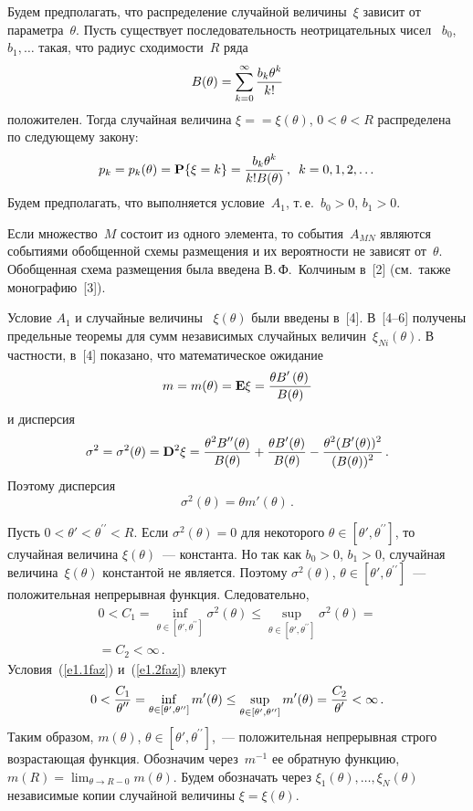 \begin{multicols}{2}
Будем предполагать, что распределение случайной величины~$\xi$
зависит от параметра~$\theta$. Пусть существует последовательность
неотрицательных чисел~ $b_0$, $b_1, \dots$ такая, что радиус
сходимости~$R$ ряда
$$ 
B(\theta)=\sum_{k=0}^{\infty}\displaystyle\frac{\displaystyle b_k\theta^k\mathstrut}{\displaystyle k!\mathstrut}
$$
положителен. Тогда  случайная величина $\xi=$\linebreak $=\xi(\theta)$, $
0<\theta<R$ распределена по следующему закону:
$$
p_k=p_k(\theta)={\mathbf
P}\{\xi=k\}=\displaystyle\frac{\displaystyle b_k\theta^k\mathstrut}{\displaystyle k!B(\theta)\mathstrut}\,,\enskip k=0,1,2,\dots
$$
Будем  предполагать, что выполняется условие~$A_1$, т.\,е.\
 $b_0>0$, $b_1>0$.

Если множество~$M$ состоит из одного элемента, то события~$A_{MN}$
являются событиями обобщенной схемы размещения и их вероятности не
зависят от~$\theta$. Обобщенная схема размещения была введена В.\,Ф.~Колчиным в~[2] (см.\ также монографию~[3]).

 Условие $A_1$ и случайные величины~ $\xi(\theta)$ были введены в~[4]. В~[4--6] 
 получены предельные теоремы для сумм независимых случайных
величин~$\xi_{Ni}(\theta)$. В частности, в~[4] показано, что
математическое ожидание
$$
m=m(\theta)=  {{\bf E}}\xi=  \displaystyle\frac{\displaystyle \theta B'\left(\theta\right)\mathstrut}{\displaystyle B(\theta)\mathstrut}
$$
и дисперсия
$$
 \sigma^2=\sigma^2(\theta)=  {{\bf D}}^2\xi=
\displaystyle\frac{\displaystyle \theta^2 B^{\prime\prime} (\theta)\mathstrut}{\displaystyle B(\theta)\mathstrut}+ \displaystyle\frac{\displaystyle \theta
B'(\theta)\mathstrut}{\displaystyle B(\theta)\mathstrut}- \displaystyle\frac{\displaystyle \theta^2
(B'(\theta))^2\mathstrut}{\displaystyle (B(\theta))^2\mathstrut}\,.
$$
Поэтому дисперсия
\begin{equation}
\sigma^2(\theta)=\theta m'(\theta)\,. \label{e1.1faz}
\end{equation}


Пусть $0<\theta'<\theta^{\prime\prime}<R$. Если $\sigma^2(\theta)=0$ для
некоторого  $\theta\in [\theta', \theta^{\prime\prime}]$, то случайная
величина $\xi(\theta)$~--- константа. Но так как $b_0>0$, $b_1>0$,
случайная величина~$\xi(\theta)$ константой не является. Поэтому
$\sigma^2(\theta)$, $\theta\in [\theta', \theta^{\prime\prime}]$~---
положительная непрерывная функция. Следовательно,
\begin{multline}
0<C_1 =\inf_{\theta\in [\theta', \theta^{\prime\prime}]} \sigma^2(\theta) \le
\sup_{\theta\in [\theta', \theta^{\prime\prime}]}\sigma^2(\theta)={}\\
{}= C_2<\infty\,.
\label{e1.2faz}
\end{multline}
Условия~(\ref{e1.1faz}) и~(\ref{e1.2faz}) влекут
$$
0<\displaystyle\frac{\displaystyle C_1\mathstrut}{\displaystyle \theta^{\prime\prime}\mathstrut}=\inf_{\theta\in [\theta',
\theta^{\prime\prime}]}m'(\theta) \le \sup_{\theta\in [\theta',
\theta^{\prime\prime}]}m'(\theta)= \displaystyle\frac{\displaystyle C_2\mathstrut}{\displaystyle \theta'\mathstrut}<\infty\,.
$$
Таким образом, $m(\theta)$, $\theta\in [\theta', \theta^{\prime\prime}]$,~---
положительная непрерывная строго возрастающая функция. Обозначим
через~$m^{-1}$ ее обратную функцию, $m(R)=\lim_{\theta\to
R-0}m(\theta)$. Будем обозначать через $\xi_1(\theta), \dots ,
\xi_N(\theta)$ независимые копии случайной величины
$\xi=\xi(\theta)$.


\end{multicols}
